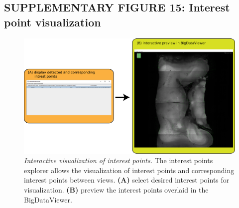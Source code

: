 \documentclass[]{spie}  %
\begin{document}
\subsection*{SUPPLEMENTARY FIGURE 15: Interest point visualization}
\vspace{1mm}
\begin{figure}[h!]
\includegraphics[width=\textwidth]{Supp-IntrestPoints.png}
\vspace{-2.0mm}
\caption{\hspace{-0.5mm} \emph{Interactive visualization of interest points.} The interest points explorer allows the visualization of interest points and corresponding interest points between views. \textbf{(A)} select desired interest points for visualization. \textbf{(B)} preview the interest points overlaid in the BigDataViewer.
}
\label{fig:sup-fig-interest-point}
\end{figure}

\pagebreak
\end{document}
